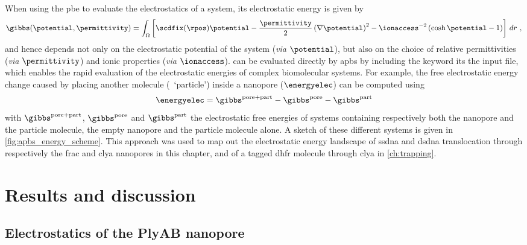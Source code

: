 When using the \gls{pbe} to evaluate the electrostatics of a system, its electrostatic energy is given
by~\cite{Baker-2005}
%
\begin{equation}\label{eq:pbe_energy}
  \gibbs (\potential, \permittivity) = \int_\Omega \left[
    \scdfix(\rpos) \potential
    - \dfrac{\permittivity}{2}\left( \nabla \potential \right)^2
    - \ionaccess^{-2} \left( \cosh \potential - 1 \right)
  \right] \,dr
  \text{ ,}
\end{equation}
%
and hence depends not only on the electrostatic potential of the system (\textit{via} $\potential$), but also
on the choice of relative permittivities (\textit{via} $\permittivity$) and ionic properties (\textit{via}
$\ionaccess$).  can be evaluated directly by \gls{apbs} by including the 
keyword its the input file, which enables the rapid evaluation of the electrostatic energies of complex
biomolecular systems. For example, the free electrostatic energy change caused by placing another molecule
(\ie~`particle') inside a nanopore ($\energyelec$) can be computed using~\cite{Homeyer-2015}
%
\begin{equation}\label{eq:electrostatic_energy}
  \energyelec = \gibbs^{\rm{pore+part}} - \gibbs^{\rm{pore}} - \gibbs^{\rm{part}}
\end{equation}
%
with $\gibbs^{\rm{pore+part}}$, $\gibbs^{\rm{pore}}$ and $\gibbs^{\rm{part}}$ the electrostatic free energies
of systems containing respectively both the nanopore and the particle molecule, the empty nanopore and the
particle molecule alone. A sketch of these different systems is given in \cref{fig:apbs_energy_scheme}. This
approach was used to map out the electrostatic energy landscape of \gls{ssdna} and \gls{dsdna} translocation
through respectively the \gls{frac} and \gls{clya} nanopores in this chapter, and of a tagged \gls{dhfr}
molecule through \gls{clya} in \cref{ch:trapping}.



%
\clearpage
%


\section{Results and discussion}
%
\label{sec:elec:results}
%


\subsection{Electrostatics of the PlyAB nanopore}
%
\label{sec:elec:plyab}
%

